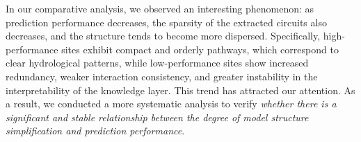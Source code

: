 In our comparative analysis, we observed an interesting phenomenon: as prediction performance decreases, the sparsity of the extracted circuits also decreases, and the structure tends to become more dispersed. Specifically, high-performance sites exhibit compact and orderly pathways, which correspond to clear hydrological patterns, while low-performance sites show increased redundancy, weaker interaction consistency, and greater instability in the interpretability of the knowledge layer\cite{ORTH2015147}. This trend has attracted our attention. As a result, we conducted a more systematic analysis to verify \textit{whether there is a significant and stable relationship between the degree of model structure simplification and prediction performance}.

